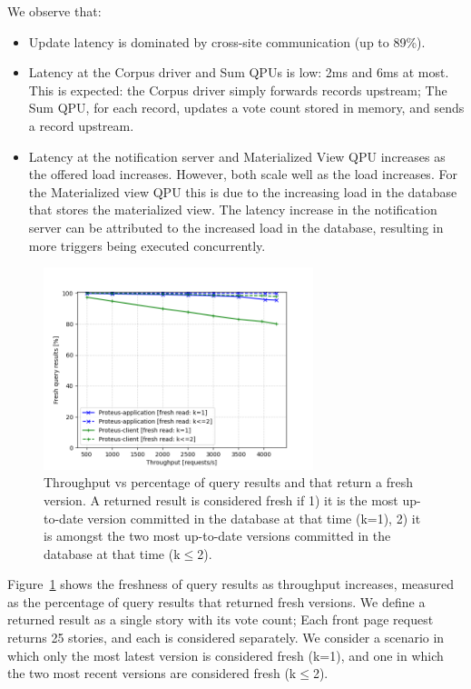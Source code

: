 We observe that:
\begin{itemize}
  \item Update latency is dominated by cross-site communication  (up to 89\%).
  \item Latency at the Corpus driver and Sum QPUs is low: 2ms and 6ms at most.
  This is expected: the Corpus driver simply forwards records upstream;
  The Sum QPU, for each record, updates a vote count stored in memory, and sends a record upstream.
  \item Latency at the notification server and Materialized View QPU increases as the offered load increases.
  However, both scale well as the load increases.
  For the Materialized view QPU this is due to the increasing load in the database that stores the materialized view.
  The latency increase in the notification server can be attributed to the increased load in the database,
  resulting in more triggers being executed concurrently.
\end{itemize}

\begin{figure}[H]
\centering
  \includegraphics[width=0.7\textwidth]{./figures/evaluation/fresh_reads_throughput.png}
  \caption{Throughput vs percentage of query results and that return a fresh version.
  A returned result is considered fresh if 1) it is the most up-to-date version committed in the database at that time (k=1),
  2) it is amongst the two most up-to-date versions committed in the database at that time (k$\leq$2).}
  \label{fig:fresh_reads_throughput}
\end{figure}

\bigskip
\noindent
Figure~\ref{fig:fresh_reads_throughput} shows the freshness of query results as throughput increases,
measured as the percentage of query results that returned fresh versions.
We define a returned result as a single story with its vote count;
Each front page request returns 25 stories, and each is considered separately.
We consider a scenario in which only the most latest version is considered fresh (k=1),
and one in which the two most recent versions are considered fresh (k$\leq$2).

